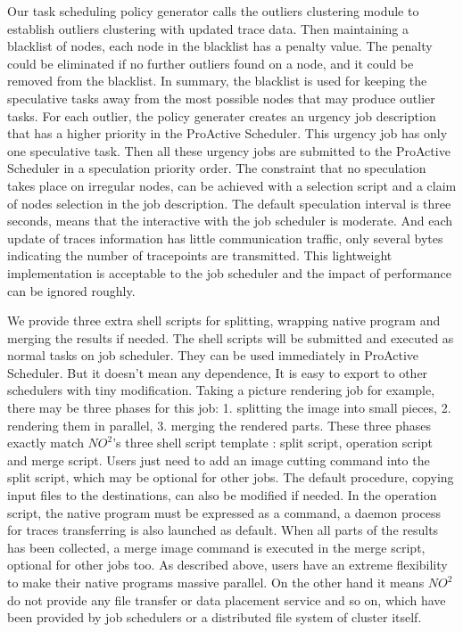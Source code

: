 Our task scheduling policy generator calls the outliers clustering module to establish outliers clustering with updated trace data. Then maintaining a blacklist of nodes, each node in the blacklist has a penalty value. The penalty could be eliminated if no further outliers found on a node, and it could be removed from the blacklist. In summary, the blacklist is used for keeping the speculative tasks away from the most possible nodes that may produce outlier tasks. For each outlier, the policy generater creates an urgency job description that has a higher priority in the ProActive Scheduler. This urgency job has only one speculative task. Then all these urgency jobs are submitted to the ProActive Scheduler in a speculation priority order. The constraint that no speculation takes place on irregular nodes, can be achieved with a selection script and a claim of nodes selection in the job description. The default speculation interval is three seconds, means that the interactive with the job scheduler is moderate. And each update of traces information has little communication traffic, only several bytes indicating the number of tracepoints are transmitted. This lightweight implementation is acceptable to the job scheduler and the impact of performance can be ignored roughly.

We provide three extra shell scripts for splitting, wrapping native program and merging the results if needed. The shell scripts will be submitted and executed as normal tasks on job scheduler. They can be used immediately in ProActive Scheduler. But it doesn't mean any dependence, It is easy to export to other schedulers with tiny modification. Taking a picture rendering job for example, there may be three phases for this job: 1. splitting the image into small pieces, 2. rendering them in parallel, 3. merging the rendered parts. These three phases exactly match $NO^2$'s three shell script template : split script, operation script and merge script. Users just need to add an image cutting command into the split script, which may be optional for other jobs. The default procedure, copying input files to the destinations, can also be modified if needed. In the operation script, the native program must be expressed as a command, a daemon process for traces transferring is also launched as default. When all parts of the results has been collected, a merge image command is executed in the merge script, optional for other jobs too. As described above,  users have an extreme flexibility to make their native programs massive parallel. On the other hand it means $NO^2$ do not provide any file transfer or data placement service and so on, which have been provided by job schedulers or a distributed file system of cluster itself.
